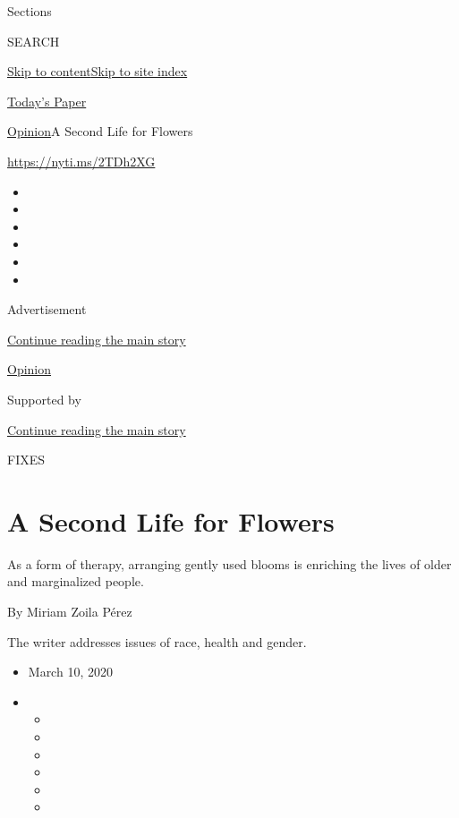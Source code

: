 Sections

SEARCH

\protect\hyperlink{site-content}{Skip to
content}\protect\hyperlink{site-index}{Skip to site index}

\href{https://myaccount.nytimes3xbfgragh.onion/auth/login?response_type=cookie\&client_id=vi}{}

\href{https://www.nytimes3xbfgragh.onion/section/todayspaper}{Today's
Paper}

\href{/section/opinion}{Opinion}\textbar{}A Second Life for Flowers

\url{https://nyti.ms/2TDh2XG}

\begin{itemize}
\item
\item
\item
\item
\item
\item
\end{itemize}

Advertisement

\protect\hyperlink{after-top}{Continue reading the main story}

\href{/section/opinion}{Opinion}

Supported by

\protect\hyperlink{after-sponsor}{Continue reading the main story}

FIXES

\hypertarget{a-second-life-for-flowers}{%
\section{A Second Life for Flowers}\label{a-second-life-for-flowers}}

As a form of therapy, arranging gently used blooms is enriching the
lives of older and marginalized people.

By Miriam Zoila Pérez

The writer addresses issues of race, health and gender.

\begin{itemize}
\item
  March 10, 2020
\item
  \begin{itemize}
  \item
  \item
  \item
  \item
  \item
  \item
  \end{itemize}
\end{itemize}

